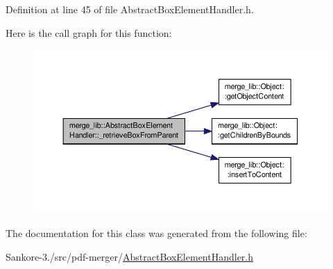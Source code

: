 Definition at line 45 of file Abstract\-Box\-Element\-Handler.\-h.



Here is the call graph for this function\-:
\nopagebreak
\begin{figure}[H]
\begin{center}
\leavevmode
\includegraphics[width=350pt]{de/dd6/classmerge__lib_1_1_abstract_box_element_handler_a81108496088501c1bce82410b94775f0_cgraph}
\end{center}
\end{figure}




The documentation for this class was generated from the following file\-:\begin{DoxyCompactItemize}
\item 
Sankore-\/3./src/pdf-\/merger/\hyperlink{_abstract_box_element_handler_8h}{Abstract\-Box\-Element\-Handler.\-h}\end{DoxyCompactItemize}
